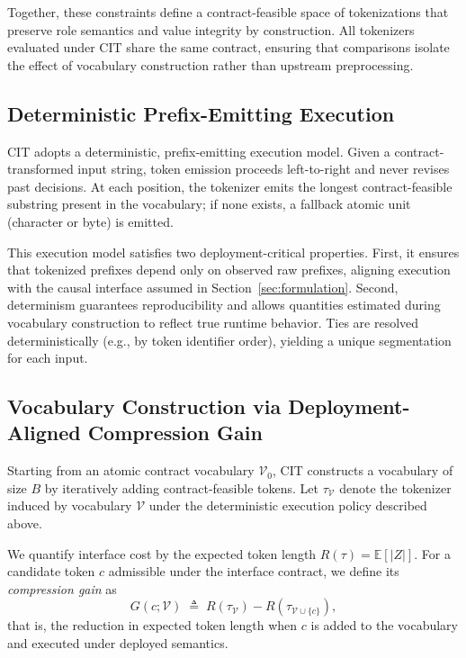 Together, these constraints define a contract-feasible space of tokenizations that preserve role semantics and value integrity by construction.
All tokenizers evaluated under CIT share the same contract, ensuring that comparisons isolate the effect of vocabulary construction rather than upstream preprocessing.

\subsection{Deterministic Prefix-Emitting Execution}
\label{sec:execution}

CIT adopts a deterministic, prefix-emitting execution model.
Given a contract-transformed input string, token emission proceeds left-to-right and never revises past decisions.
At each position, the tokenizer emits the longest contract-feasible substring present in the vocabulary; if none exists, a fallback atomic unit (character or byte) is emitted.

This execution model satisfies two deployment-critical properties.
First, it ensures that tokenized prefixes depend only on observed raw prefixes, aligning execution with the causal interface assumed in Section~\ref{sec:formulation}.
Second, determinism guarantees reproducibility and allows quantities estimated during vocabulary construction to reflect true runtime behavior.
Ties are resolved deterministically (e.g., by token identifier order), yielding a unique segmentation for each input.

\subsection{Vocabulary Construction via Deployment-Aligned Compression Gain}
\label{sec:construction}

Starting from an atomic contract vocabulary $\mathcal{V}_0$, CIT constructs a vocabulary of size $B$ by iteratively adding contract-feasible tokens.
Let $\tau_{\mathcal{V}}$ denote the tokenizer induced by vocabulary $\mathcal{V}$ under the deterministic execution policy described above.

We quantify interface cost by the expected token length $R(\tau)=\mathbb{E}[|Z|]$.
For a candidate token $c$ admissible under the interface contract, we define its \emph{compression gain} as
\begin{equation}
G(c;\mathcal{V})
\;\triangleq\;
R(\tau_{\mathcal{V}}) - R(\tau_{\mathcal{V}\cup\{c\}}),
\label{eq:gain}
\end{equation}
that is, the reduction in expected token length when $c$ is added to the vocabulary and executed under deployed semantics.

